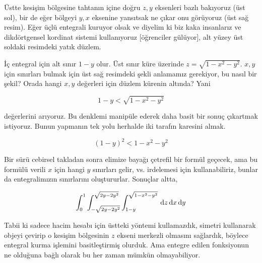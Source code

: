 \documentclass[12pt,fleqn]{article}\usepackage{../../common}
\begin{document}
Üstte kesişim bölgesine tahtanın içine doğru $z,y$ eksenleri bazlı
bakıyoruz (üst sol), bir de eğer bölgeyi $y,x$ eksenine yansıtsak ne çıkar
onu görüyoruz (üst sağ resim). Eğer üçlü entegrali kuruyor olsak ve diyelim
ki biz kaka insanlarız ve dikdörtgensel kordinat sistemi kullanıyoruz
[öğrenciler gülüyor], alt yüzey üst soldaki resimdeki yatık düzlem. 

İç entegral için alt sınır $1-y$ olur. Üst sınır küre üzerinde
$z = \sqrt{1-x^2-y^2}$. $x,y$ için sınırları bulmak için üst sağ resimdeki
şekli anlamamız gerekiyor, bu nasıl bir şekil? Orada hangi $x,y$ değerleri
için düzlem kürenin altında? Yani 

$$ 1-y < \sqrt{1-x^2-y^2} $$

değerlerini arıyoruz. Bu denklemi manipüle ederek daha basit bir sonuç
çıkartmak istiyoruz. Bunun yapmanın tek yolu herhalde iki tarafın karesini
almak. 

$$ (1-y)^2 < 1-x^2-y^2 $$

Bir sürü cebirsel takladan sonra elimize bayağı çetrefil bir formül
geçecek, ama bu formülü verili $x$ için hangi $y$ sınırları gelir,
vs. irdelemesi için kullanabiliriz, bunlar da entegralimızın sınırlarını
oluştururlar. Sonuçlar altta,

$$ 
\int_{0}^{1} 
\int_{-\sqrt{2y-2y^2}}^{\sqrt{2y-2y^2}} 
\int_{1-y}^{\sqrt{1-x^2-y^2}}
\,\mathrm{d} z \,\mathrm{d} x \,\mathrm{d} y
$$

Tabii ki sadece hacim hesabı için üstteki yöntemi kullamazdık, simetri
kullanarak objeyi çevirip o kesişim bölgesinin $z$ ekseni merkezli olmasını
sağlardık, böylece entegral kurma işlemini basitleştirmiş olurduk. Ama
entegre edilen fonksiyonun ne olduğuna bağlı olarak bu her zaman mümkün
olmayabiliyor. 
\end{document}
